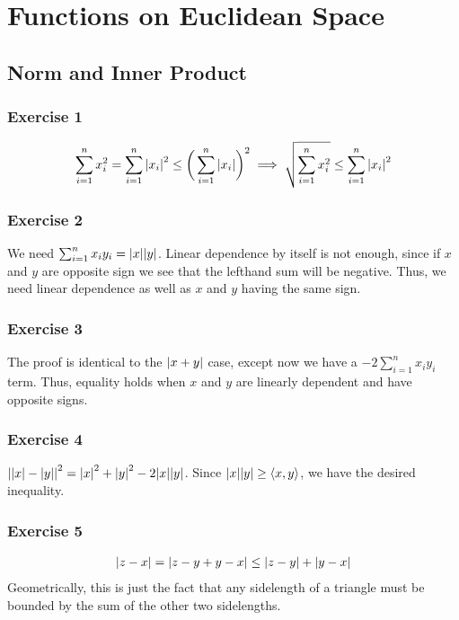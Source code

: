 \section{Functions on Euclidean Space}

\subsection{Norm and Inner Product}

\subsubsection{Exercise 1}
\begin{align*}
        \sum_{i = 1}^n x_i^2  = \sum_{i = 1}^n \abs{x_i}^2 \leq \bigg(\sum_{i = 1}^n \abs{x_i}\bigg)^2 
        \implies \sqrt{\sum_{i = 1}^n x_i^2} \leq \sum_{i = 1}^n \abs{x_i}^2 
\end{align*}

\subsubsection{Exercise 2}
We need $\sum_{i = 1}^n x_i y_i = \abs{x} \abs{y}$. Linear dependence by itself is not enough, since if
$x$ and $y$ are opposite sign we see that the lefthand sum will be negative. Thus, we need linear dependence 
as well as $x$ and $y$ having the same sign.

\subsubsection{Exercise 3}
The proof is identical to the $\abs{x + y}$ case, except now we have a $-2 \sum_{i = 1}^n x_i y_i$ term.
Thus, equality holds when $x$ and $y$ are linearly dependent and have opposite signs.

\subsubsection{Exercise 4}
$\abs{\abs{x} - \abs{y}}^2 = \abs{x}^2 + \abs{y}^2 - 2\abs{x} \abs{y}$. Since $\abs{x} \abs{y} \geq \langle x, y \rangle$, we have the desired inequality.

\subsubsection{Exercise 5}
\begin{align*}
        \abs{z - x} = \abs{z - y + y - x} \leq \abs{z - y} + \abs{y - x}
\end{align*}
Geometrically, this is just the fact that any sidelength of a triangle must be bounded by the sum of the
other two sidelengths.

